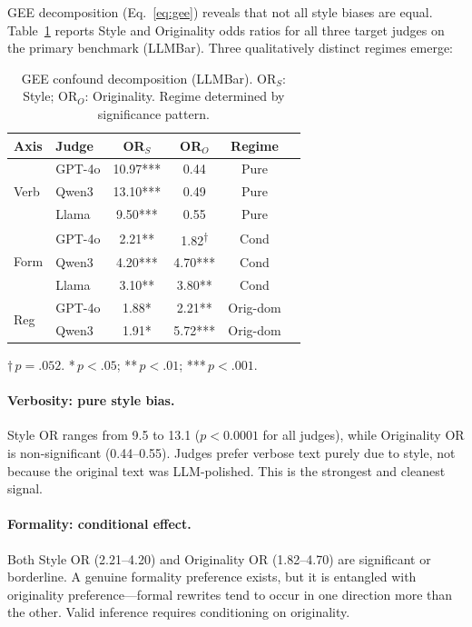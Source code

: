 \documentclass[11pt,twocolumn]{article}
\begin{document}
GEE decomposition (Eq.~\ref{eq:gee}) reveals that not all style biases are equal. Table~\ref{tab:gee} reports Style and Originality odds ratios for all three target judges on the primary benchmark (LLMBar). Three qualitatively distinct regimes emerge:

\begin{table}[t]
\centering
\small
\caption{GEE confound decomposition (LLMBar). OR$_S$: Style; OR$_O$: Originality. Regime determined by significance pattern.}
\label{tab:gee}
\begin{tabular}{@{}llcccl@{}}
\toprule
Axis & Judge & OR$_S$ & OR$_O$ & Regime \\
\midrule
\multirow{3}{*}{Verb}
 & GPT-4o & 10.97*** & 0.44 & Pure \\
 & Qwen3 & 13.10*** & 0.49 & Pure \\
 & Llama & 9.50*** & 0.55 & Pure \\
\midrule
\multirow{3}{*}{Form}
 & GPT-4o & 2.21** & 1.82\textsuperscript{$\dagger$} & Cond \\
 & Qwen3 & 4.20*** & 4.70*** & Cond \\
 & Llama & 3.10** & 3.80** & Cond \\
\midrule
\multirow{2}{*}{Reg}
 & GPT-4o & 1.88* & 2.21** & Orig-dom \\
 & Qwen3 & 1.91* & 5.72*** & Orig-dom \\
\bottomrule
\end{tabular}

{\raggedright \scriptsize $\dagger$\,$p{=}.052$. *\,$p{<}.05$; **\,$p{<}.01$; ***\,$p{<}.001$.\par}
\vspace{-3mm}
\end{table}

\paragraph{Verbosity: pure style bias.} Style OR ranges from 9.5 to 13.1 ($p < 0.0001$ for all judges), while Originality OR is non-significant (0.44--0.55). Judges prefer verbose text purely due to style, not because the original text was LLM-polished. This is the strongest and cleanest signal.

\paragraph{Formality: conditional effect.} Both Style OR (2.21--4.20) and Originality OR (1.82--4.70) are significant or borderline. A genuine formality preference exists, but it is entangled with originality preference---formal rewrites tend to occur in one direction more than the other. Valid inference requires conditioning on originality.
\end{document}
